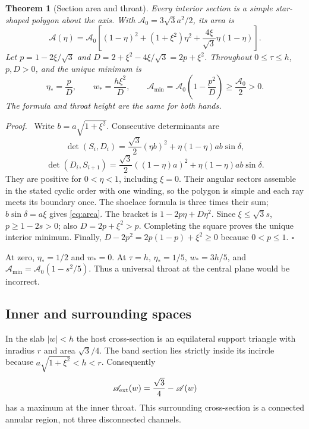 \documentclass[11pt,a4paper]{article}
\numberwithin{equation}{section}
\newtheorem{theorem}{Theorem}[section]
\newenvironment{proof}[1][Proof]{\par\noindent\textit{#1.}\ \ignorespaces}
{\unskip\nobreak\hfill$\square$\par}
\begin{document}
\begin{theorem}[Section area and throat]\label{thm:area}
Every interior section is a simple star-shaped polygon about the axis. With
$\mathscr A_0=3\sqrt3a^2/2$, its area is
\begin{equation}\label{eq:area}
\mathscr A(\eta)=\mathscr A_0\left[
(1-\eta)^2+(1+\xi^2)\eta^2+
\frac{4\xi}{\sqrt3}\eta(1-\eta)\right].
\end{equation}
Let $p=1-2\xi/\sqrt3$ and $D=2+\xi^2-4\xi/\sqrt3=2p+\xi^2$.
Throughout $0\leq\tau\leq h$, $p,D>0$, and the unique minimum is
\begin{equation}\label{eq:throat}
\eta_*=\frac pD,\qquad
w_*=\frac{h\xi^2}{D},\qquad
\mathscr A_{\min}=\mathscr A_0\left(1-\frac{p^2}{D}\right)
\geq\frac{\mathscr A_0}{2}>0.
\end{equation}
The formula and throat height are the same for both hands.
\end{theorem}
\begin{proof}
Write $b=a\sqrt{1+\xi^2}$. Consecutive determinants are
\[
\det(S_i,D_i)=\frac{\sqrt3}{2}(\eta b)^2+
\eta(1-\eta)ab\sin\delta,
\]
\[
\det(D_i,S_{i+1})=\frac{\sqrt3}{2}((1-\eta)a)^2+
\eta(1-\eta)ab\sin\delta.
\]
They are positive for $0<\eta<1$, including $\xi=0$. Their angular sectors
assemble in the stated cyclic order with one winding, so the polygon is
simple and each ray meets its boundary once. The shoelace formula is three
times their sum; $b\sin\delta=a\xi$ gives \eqref{eq:area}.
The bracket is $1-2p\eta+D\eta^2$.
Since $\xi\leq\sqrt3s$, $p\geq1-2s>0$; also $D=2p+\xi^2>p$.
Completing the square proves the unique interior minimum. Finally,
$D-2p^2=2p(1-p)+\xi^2\geq0$ because $0<p\leq1$.
\end{proof}

At zero, $\eta_*=1/2$ and $w_*=0$. At $\tau=h$,
$\eta_*=1/5$, $w_*=3h/5$, and
$\mathscr A_{\min}=\mathscr A_0(1-s^2/5)$.
Thus a universal throat at the central plane would be incorrect.

\subsection{Inner and surrounding spaces}
In the slab $|w|<h$ the host cross-section is an equilateral support triangle
with inradius $r$ and area $\sqrt3/4$. The band section lies strictly inside
its incircle because $a\sqrt{1+\xi^2}<h<r$. Consequently
\begin{equation}\label{eq:complement}
\mathscr A_{\rm ext}(w)=\frac{\sqrt3}{4}-\mathscr A(w)
\end{equation}
has a maximum at the inner throat. This surrounding cross-section is a
connected annular region, not three disconnected channels.
\end{document}
